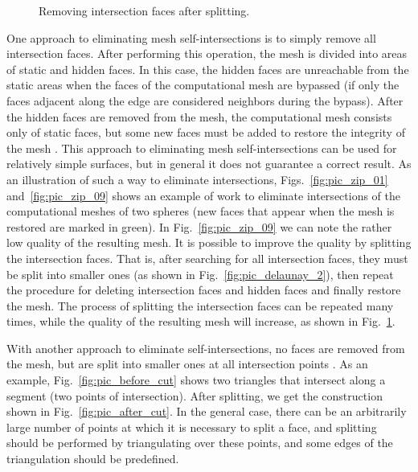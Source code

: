\documentclass[
11pt,
tightenlines,
twoside,
onecolumn,
nofloats,
nobibnotes,
nofootinbib,
superscriptaddress,
noshowpacs,
centertags]
{revtex4-2}
\begin{document}
\begin{figure}[h]
\begin{minipage}[h]{0.3\textwidth}
    \caption{Removing intersection faces after splitting.}\label{fig:pic_zip_15}
  \end{minipage}
\end{figure}

One approach to eliminating mesh self-intersections is to simply remove all intersection faces.
After performing this operation, the mesh is divided into areas of static and hidden faces.
In this case, the hidden faces are unreachable from the static areas when the faces of the computational mesh are bypassed (if only the faces adjacent along the edge are considered neighbors during the bypass).
After the hidden faces are removed from the mesh, the computational mesh consists only of static faces, but some new faces must be added to restore the integrity of the mesh \cite{Charton}.
This approach to eliminating mesh self-intersections can be used for relatively simple surfaces, but in general it does not guarantee a correct result.
As an illustration of such a way to eliminate intersections,
Figs.~\ref{fig:pic_zip_01} and~\ref{fig:pic_zip_09} shows an example
of work to eliminate intersections of the computational meshes of
two spheres (new faces that appear when the mesh is restored are
marked in green).
In Fig.~\ref{fig:pic_zip_09} we can note the rather low quality of the resulting mesh.
It is possible to improve the quality by splitting the intersection faces.
That is, after searching for all intersection faces, they must be split into smaller ones (as shown in Fig.~\ref{fig:pic_delaunay_2}), then repeat the procedure for deleting intersection faces and hidden faces and finally restore the mesh.
The process of splitting the intersection faces can be repeated many times, while the quality of the resulting mesh will increase, as shown in Fig.~\ref{fig:pic_zip_15}.

With another approach to eliminate self-intersections, no faces are removed from the mesh, but are split into smaller ones at all intersection points \cite{Skvorkovska}.
As an example, Fig.~\ref{fig:pic_before_cut} shows two triangles that intersect along a segment (two points of intersection).
After splitting, we get the construction shown in Fig.~\ref{fig:pic_after_cut}.
In the general case, there can be an arbitrarily large number of points at which it is necessary to split a face, and splitting should be performed by triangulating over these points, and some edges of the triangulation should be predefined.
\end{document}
